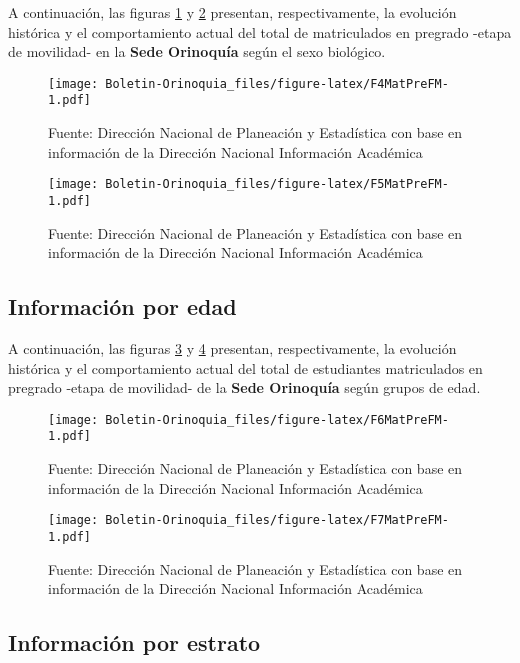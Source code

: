 \documentclass[
]{book}
\begin{document}
A continuación, las figuras \ref{fig:F4MatPreFM} y \ref{fig:F5MatPreFM} presentan, respectivamente, la evolución histórica y el comportamiento actual del total de matriculados en pregrado -etapa de movilidad- en la \textbf{Sede Orinoquía} según el sexo biológico.

\begin{figure}
\centering
\texttt{[image: Boletin-Orinoquia\_files/figure-latex/F4MatPreFM-1.pdf]}
\caption{\label{fig:F4MatPreFM}Fuente: Dirección Nacional de Planeación y Estadística con base en información de la Dirección Nacional Información Académica}
\end{figure}

\begin{figure}
\centering
\texttt{[image: Boletin-Orinoquia\_files/figure-latex/F5MatPreFM-1.pdf]}
\caption{\label{fig:F5MatPreFM}Fuente: Dirección Nacional de Planeación y Estadística con base en información de la Dirección Nacional Información Académica}
\end{figure}

\hypertarget{informaciuxf3n-por-edad-4}{%
\subsection{Información por edad}\label{informaciuxf3n-por-edad-4}}

A continuación, las figuras \ref{fig:F6MatPreFM} y \ref{fig:F7MatPreFM} presentan, respectivamente, la evolución histórica y el comportamiento actual del total de estudiantes matriculados en pregrado -etapa de movilidad- de la \textbf{Sede Orinoquía} según grupos de edad.

\begin{figure}
\centering
\texttt{[image: Boletin-Orinoquia\_files/figure-latex/F6MatPreFM-1.pdf]}
\caption{\label{fig:F6MatPreFM}Fuente: Dirección Nacional de Planeación y Estadística con base en información de la Dirección Nacional Información Académica}
\end{figure}

\begin{figure}
\centering
\texttt{[image: Boletin-Orinoquia\_files/figure-latex/F7MatPreFM-1.pdf]}
\caption{\label{fig:F7MatPreFM}Fuente: Dirección Nacional de Planeación y Estadística con base en información de la Dirección Nacional Información Académica}
\end{figure}

\hypertarget{informaciuxf3n-por-estrato-2}{%
\subsection{Información por estrato}\label{informaciuxf3n-por-estrato-2}}
\end{document}

